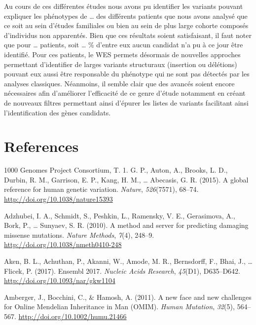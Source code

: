 \documentclass[12pt,twoside]{reedthesis}
\theoremstyle{definition}
\theoremstyle{definition}
\theoremstyle{remark}
\begin{document}
  Au cours de ces différentes études nous avons pu identifier les variants
  pouvant expliquer les phénotypes de \ldots{} des différents patients que
  nous avons analysé que ce soit au sein d'études familiales ou bien au
  sein de plus large cohorte composés d'individus non apparentés. Bien que
  ces résultats soient satisfaisant, il faut noter que pour \ldots{}
  patients, soit \ldots{} \% d'entre eux aucun candidat n'a pu à ce jour
  être identifié. Pour ces patients, le WES permets désormais de nouvelles
  approches permettant d'identifier de larges variants structuraux
  (insertion ou délétions) pouvant eux aussi être responsable du phénotype
  qui ne sont pas détectés par les analyses classiques. Néanmoins, il
  semble clair que des avancés soient encore nécessaires afin d'améliorer
  l'efficacité de ce genre d'étude notamment en créant de nouveaux filtres
  permettant ainsi d'épurer les listes de variants facilitant ainsi
  l'identification des gènes candidats.
  
  \chapter*{References}\label{references}
  
  \hypertarget{refs}{}
  \hypertarget{ref-1000GenomesProjectConsortium2015}{}
  1000 Genomes Project Consortium, T. 1. G. P., Auton, A., Brooks, L. D.,
  Durbin, R. M., Garrison, E. P., Kang, H. M., \ldots{} Abecasis, G. R.
  (2015). A global reference for human genetic variation. \emph{Nature},
  \emph{526}(7571), 68--74. \url{http://doi.org/10.1038/nature15393}
  
  \hypertarget{ref-Adzhubei2010}{}
  Adzhubei, I. A., Schmidt, S., Peshkin, L., Ramensky, V. E., Gerasimova,
  A., Bork, P., \ldots{} Sunyaev, S. R. (2010). A method and server for
  predicting damaging missense mutations. \emph{Nature Methods},
  \emph{7}(4), 248--9. \url{http://doi.org/10.1038/nmeth0410-248}
  
  \hypertarget{ref-Aken2017}{}
  Aken, B. L., Achuthan, P., Akanni, W., Amode, M. R., Bernsdorff, F.,
  Bhai, J., \ldots{} Flicek, P. (2017). Ensembl 2017. \emph{Nucleic Acids
  Research}, \emph{45}(D1), D635--D642.
  \url{http://doi.org/10.1093/nar/gkw1104}
  
  \hypertarget{ref-Amberger2011}{}
  Amberger, J., Bocchini, C., \& Hamosh, A. (2011). A new face and new
  challenges for Online Mendelian Inheritance in Man (OMIM). \emph{Human
  Mutation}, \emph{32}(5), 564--567.
  \url{http://doi.org/10.1002/humu.21466}
  
\end{document}
